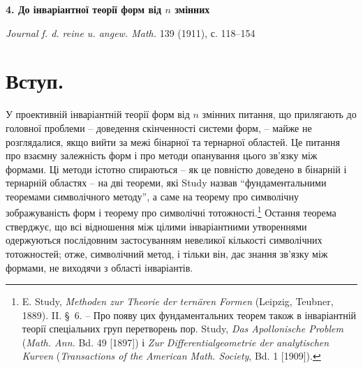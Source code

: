 \documentclass[11pt]{article}
\begin{document}
\begin{center}
{\Large\bfseries 4. До інваріантної теорії форм від $n$ змінних}\par
\vspace{1.2em}
\emph{Journal f. d. reine u. angew. Math.} 139 (1911), с. 118--154
\end{center}

\section*{Вступ.}
У проективній інваріантній теорії форм від $n$ змінних питання, що прилягають до головної проблеми -- доведення скінченності системи форм, -- майже не розглядалися, якщо вийти за межі бінарної та тернарної областей. Це питання про взаємну залежність форм і про методи опанування цього зв'язку між формами. Ці методи істотно спираються -- як це повністю доведено в бінарній і тернарній областях -- на дві теореми, які Study назвав ``фундаментальними теоремами символічного методу'', а саме на теорему про символічну зображуваність форм і теорему про символічні тотожності.\footnote{E. Study, \emph{Methoden zur Theorie der ternären Formen} (Leipzig, Teubner, 1889). II. \S\ 6. -- Про появу цих фундаментальних теорем також в інваріантній теорії спеціальних груп перетворень пор. Study, \emph{Das Apollonische Problem} (\emph{Math. Ann.} Bd. 49 [1897]) і \emph{Zur Differentialgeometrie der analytischen Kurven} (\emph{Transactions of the American Math. Society}, Bd. 1 [1909]).} Остання теорема стверджує, що всі відношення між цілими інваріантними утвореннями одержуються послідовним застосуванням невеликої кількості символічних тотожностей; отже, символічний метод, і тільки він, дає знання зв'язку між формами, не виходячи з області інваріантів.
\end{document}
